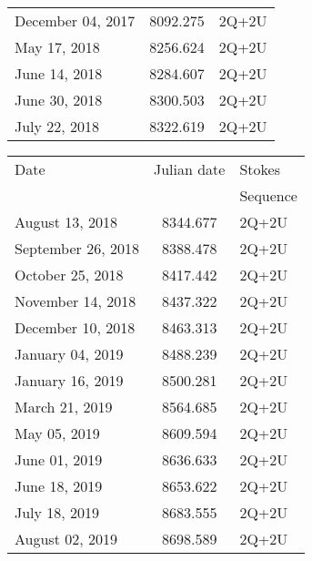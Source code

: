 \documentclass{/Users/art2/TeX/aanda/aa}
\begin{document}
\begin{appendix}
\begin{table} [h]
\begin{tabular}{lcl}
December 04, 2017 & 8092.275 & 2Q+2U \\

May 17, 2018 & 8256.624 & 2Q+2U \\

June 14, 2018 & 8284.607 & 2Q+2U \\

June 30, 2018 & 8300.503 & 2Q+2U \\

July 22, 2018 & 8322.619 & 2Q+2U \\
\hline
\end{tabular}
\end{table}
 \begin{table} [t]
\begin{tabular}{lcl}%

\hline 
\hline
Date &  Julian date & Stokes \\
&&Sequence \\
 \hline
 


August 13, 2018 & 8344.677 & 2Q+2U \\

September 26, 2018 & 8388.478 & 2Q+2U \\

October 25, 2018 & 8417.442 & 2Q+2U \\

November 14, 2018 & 8437.322 & 2Q+2U \\

December 10, 2018 & 8463.313 & 2Q+2U \\

January 04, 2019 & 8488.239 & 2Q+2U \\

January 16, 2019 & 8500.281 & 2Q+2U \\

March 21, 2019 & 8564.685 & 2Q+2U \\

May 05, 2019 & 8609.594 & 2Q+2U \\

June 01, 2019 & 8636.633 & 2Q+2U \\

June 18, 2019 & 8653.622 & 2Q+2U \\


July 18, 2019 & 8683.555 & 2Q+2U \\

August 02, 2019 & 8698.589 & 2Q+2U \\


\end{tabular}
\end{table}
\end{appendix}
\end{document}
